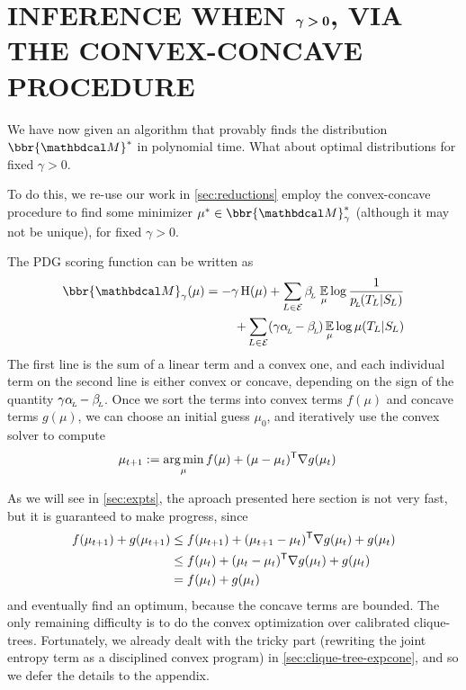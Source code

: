 \documentclass[twoside]{article}
\begin{document}
\section{INFERENCE WHEN
    \texorpdfstring{$\boldsymbol\gamma \boldsymbol> \mathbf{0}$}{gamma > 0},
    VIA THE CONVEX-CONCAVE PROCEDURE }

We have now given an algorithm that provably finds the distribution $\bbr{\dg M}^*$ in polynomial time. 
What about optimal distributions for fixed $\gamma > 0$.



To do this, we re-use our work in \cref{sec:reductions} employ the convex-concave procedure 
\parencite{yuille2003concave} to find some minimizer $\mu^* \in \bbr{\dg M}^*_\gamma$ (although it may not be unique), for fixed $\gamma > 0$.

The PDG scoring function can be written as \parencite[Proposition 4.6]{pdg-aaai}
\begin{align*}
    \bbr{\dg M}_\gamma(\mu) = 
        -\gamma\H(\mu) + 
            \sum_{L \in \Ed}
                \beta\ssub L\, \Ex_\mu 
                    \log \frac1{p\ssub L(\Tgt L | \Src L)}
                \\
            + \sum_{L \in \Ed}
            (\gamma \alpha \ssub L - \beta\ssub L)
                \Ex_\mu \log \mu(\Tgt L | \Src L)
\end{align*}
The first line is the sum of a linear term and a convex one,
and each individual term on the second line is either convex or concave, depending on the sign of the quantity $\gamma \alpha_{\!_{L}\!} - \beta_{\!_{L}\!}$. 
Once we sort the terms into convex terms $f(\mu)$ and concave terms $g(\mu)$, we can choose an initial guess $\mu_0$, and iteratively use the convex solver to compute
%
\begin{align*}
    \mu_{t+1} &:= \operatorname*{arg\,min}_{\mu} f(\mu) + (\mu - \mu_{t})^{\sf T}
        \nabla g(\mu_t)
\end{align*}

As we will see in \cref{sec:expts}, the aproach presented here section is 
not very fast, but it is guaranteed to make progress, since
\begin{align*}
    f(\mu_{t+1}) + g(\mu_{t+1}) &\le  f(\mu_{t+1}) + (\mu_{t+1}-\mu_t)^{\sf T} \nabla g(\mu_t) + g(\mu_t)
        \\
    &\le  f(\mu_t) + (\mu_t - \mu_{t})^{\sf T}\nabla g(\mu_t)  + g(\mu_t)
        \\
    &= f(\mu_t) + g(\mu_t)
\end{align*}
and eventually find an optimum, because the concave terms are bounded.
%
%
The only remaining difficulty is to do the convex optimization over
calibrated clique-trees. Fortunately, we already dealt with the 
tricky part (rewriting the joint entropy term as a disciplined convex program) in 
\cref{sec:clique-tree-expcone},
and so we defer the details to the appendix.
    
\end{document}
